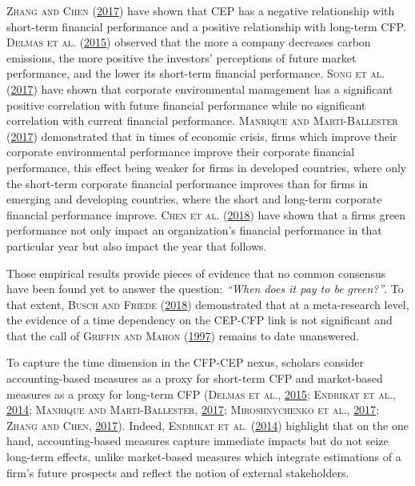 \documentclass[12pt,]{article}
\begin{document}
\textsc{Zhang and Chen} (\protect\hyperlink{ref-Zhang2017}{2017}) have
shown that CEP has a negative relationship with short-term financial
performance and a positive relationship with long-term CFP.
\textsc{Delmas et al.} (\protect\hyperlink{ref-Delmas2015}{2015})
observed that the more a company decreases carbon emissions, the more
positive the investors' perceptions of future market performance, and
the lower its short-term financial performance. \textsc{Song et al.}
(\protect\hyperlink{ref-SongCanenvironmentalmanagement2017}{2017}) have
shown that corporate environmental management has a significant positive
correlation with future financial performance while no significant
correlation with current financial performance. \textsc{Manrique and
Martí-Ballester}
(\protect\hyperlink{ref-ManriqueAnalyzingEffectCorporate2017}{2017})
demonstrated that in times of economic crisis, firms which improve their
corporate environmental performance improve their corporate financial
performance, this effect being weaker for firms in developed countries,
where only the short-term corporate financial performance improves than
for firms in emerging and developing countries, where the short and
long-term corporate financial performance improve. \textsc{Chen et al.}
(\protect\hyperlink{ref-Chencrosscountrycomparisongreen2018}{2018}) have
shown that a firms green performance not only impact an organization's
financial performance in that particular year but also impact the year
that follows.

Those empirical results provide pieces of evidence that no common
consensus have been found yet to answer the question: \emph{``When does
it pay to be green?''}. To that extent, \textsc{Busch and Friede}
(\protect\hyperlink{ref-Busch2018}{2018}) demonstrated that at a
meta-research level, the evidence of a time dependency on the CEP-CFP
link is not significant and that the call of \textsc{Griffin and Mahon}
(\protect\hyperlink{ref-Griffin1997}{1997}) remains to date unanswered.

To capture the time dimension in the CFP-CEP nexus, scholars consider
accounting-based measures as a proxy for short-term CFP and market-based
measures as a proxy for long-term CFP (\textsc{Delmas et al.},
\protect\hyperlink{ref-Delmas2015}{2015}; \textsc{Endrikat et al.},
\protect\hyperlink{ref-EndrikatMakingsenseconflicting2014}{2014};
\textsc{Manrique and Martí-Ballester},
\protect\hyperlink{ref-ManriqueAnalyzingEffectCorporate2017}{2017};
\textsc{Miroshnychenko et al.},
\protect\hyperlink{ref-MiroshnychenkoGreenpracticesfinancial2017}{2017};
\textsc{Zhang and Chen}, \protect\hyperlink{ref-Zhang2017}{2017}).
Indeed, \textsc{Endrikat et al.}
(\protect\hyperlink{ref-EndrikatMakingsenseconflicting2014}{2014})
highlight that on the one hand, accounting-based measures capture
immediate impacts but do not seize long-term effects, unlike
market-based measures which integrate estimations of a firm's future
prospects and reflect the notion of external stakeholders.
\end{document}
